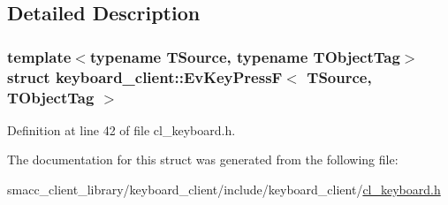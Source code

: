 \subsection{Detailed Description}
\subsubsection*{template$<$typename T\+Source, typename T\+Object\+Tag$>$\newline
struct keyboard\+\_\+client\+::\+Ev\+Key\+Press\+F$<$ T\+Source, T\+Object\+Tag $>$}



Definition at line 42 of file cl\+\_\+keyboard.\+h.



The documentation for this struct was generated from the following file\+:\begin{DoxyCompactItemize}
\item 
smacc\+\_\+client\+\_\+library/keyboard\+\_\+client/include/keyboard\+\_\+client/\hyperlink{cl__keyboard_8h}{cl\+\_\+keyboard.\+h}\end{DoxyCompactItemize}

